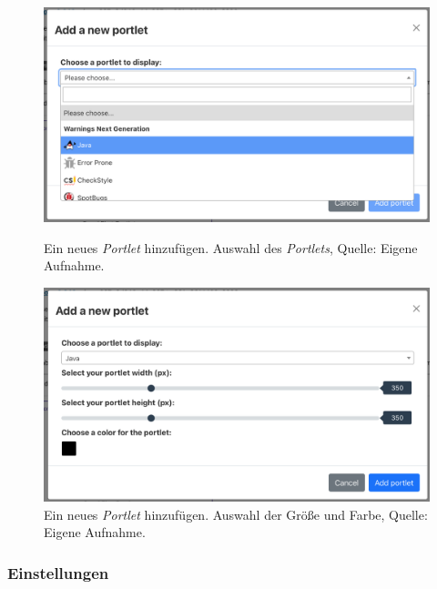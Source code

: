 \begin{figure}[h!]
\begin{minipage}[t]{0.49\textwidth}
\centering
\includegraphics[width=\textwidth]{source/images/add1}
\caption[Ein neues \textit{Portlet} hinzufügen. Auswahl des \textit{Portlets}.]{Ein neues \textit{Portlet} hinzufügen. Auswahl des \textit{Portlets}, Quelle: Eigene Aufnahme.}
\label{fig:add1}
\end{minipage}
\hspace{0.1cm}
\begin{minipage}[t]{0.49\textwidth}
\centering
\includegraphics[width=\textwidth]{source/images/add2}
\caption[Ein neues \textit{Portlet} hinzufügen. Auswahl der Größe und Farbe.]{Ein neues \textit{Portlet} hinzufügen. Auswahl der Größe und Farbe, Quelle: Eigene Aufnahme.}
\label{fig:add2}
\end{minipage}
\end{figure}


\subsubsection{Einstellungen}
\label{chap:settings}

